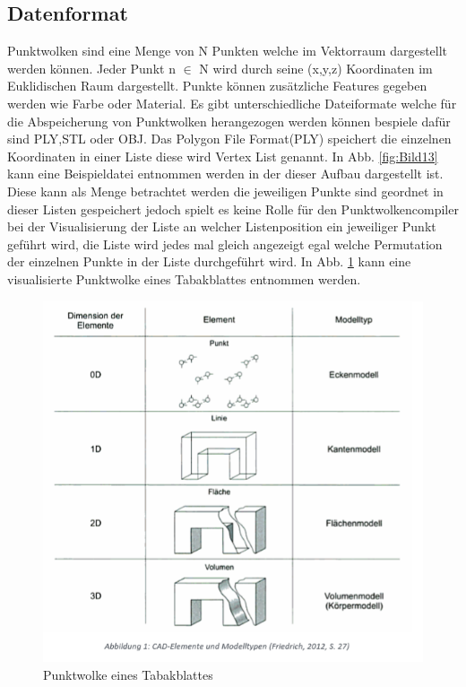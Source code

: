 \documentclass{llncs}
\begin{document}
\subsection{Datenformat}

Punktwolken sind eine Menge von N Punkten welche im Vektorraum dargestellt werden können. Jeder Punkt n $\in$ N wird durch seine (x,y,z) Koordinaten im Euklidischen Raum dargestellt. Punkte können zusätzliche Features gegeben werden wie Farbe oder Material. Es gibt unterschiedliche Dateiformate welche für die Abspeicherung von Punktwolken herangezogen werden können bespiele dafür sind PLY,STL oder OBJ. Das Polygon File Format(PLY) speichert die einzelnen Koordinaten in einer Liste diese wird Vertex List genannt. In Abb. \ref{fig:Bild13} kann eine Beispieldatei entnommen werden in der dieser Aufbau dargestellt ist. Diese kann als Menge betrachtet werden die jeweiligen Punkte sind geordnet in dieser Listen gespeichert jedoch spielt es keine Rolle für den Punktwolkencompiler bei der Visualisierung der Liste an welcher Listenposition ein jeweiliger Punkt geführt wird, die Liste wird jedes mal gleich angezeigt egal welche Permutation der einzelnen Punkte in der Liste durchgeführt wird. In Abb. \ref{fig:Bild12} kann eine visualisierte Punktwolke eines Tabakblattes entnommen werden. 

\begin{figure}[htbp] 
	\centering
	\includegraphics[width=1.0\textwidth]{datenformat.png}
	\caption{Punktwolke eines Tabakblattes}
	\label{fig:Bild12}
\end{figure}
\end{document}
